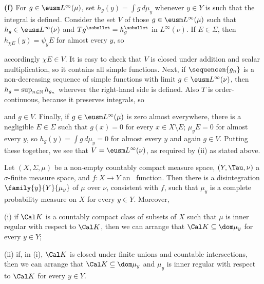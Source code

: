 {\medskip

{\bf (f)} For $g\in\eusm L^{\infty}(\mu)$, set $h_g(y)=\int g\,d\mu_y$
whenever $y\in Y$ is such that the integral is defined.   Consider the
set $V$ of those $g\in\eusm L^{\infty}(\mu)$ such that
$h_g\in\eusm L^{\infty}(\nu)$ and $Tg^{\ssbullet}=h_g^{\ssbullet}$ in
$L^{\infty}(\nu)$.   If $E\in\Sigma$, then $h_{\chi E}(y)=\psi_yE$ for
almost every $y$, so


\noindent accordingly $\chi E\in V$.   It is easy to check that $V$ is
closed under addition and scalar multiplication, so it contains all
simple functions.   Next, if $\sequencen{g_n}$ is a non-decreasing
sequence of simple functions with limit $g\in\eusm L^{\infty}(\nu)$,
then $h_g=\sup_{n\in\Bbb N}h_{g_n}$ wherever the right-hand side is
defined.   Also $T$ is order-continuous, because it preserves integrals,
so


\noindent and $g\in V$.   Finally, if $g\in\eusm L^{\infty}(\mu)$ is
zero almost everywhere, there is a negligible $E\in\Sigma$ such that
$g(x)=0$ for every $x\in X\setminus E$;  $\mu_yE=0$ for almost every
$y$, so $h_g(y)=\int g\,d\mu_y=0$ for almost every $y$ and again
$g\in V$.   Putting these together, we see that
$V=\eusm L^{\infty}(\nu)$, as required by (ii) as stated above.
}%

 Let $(X,\Sigma,\mu)$
be a non-empty countably compact
measure space, $(Y,\Tau,\nu)$ a $\sigma$-finite measure space, and
$f:X\to Y$ an \imp\ function.   Then there is a disintegration
$\family{y}{Y}{\mu_y}$ of $\mu$ over $\nu$, consistent with $f$, such
that $\mu_y$ is a complete probability measure on $X$
for every $y\in Y$.   Moreover,

(i) if $\Cal K$ is a countably compact class of subsets of $X$ such that
$\mu$ is inner regular with respect to $\Cal K$, then we can arrange
that $\Cal K\subseteq\dom\mu_y$ for every $y\in Y$;

(ii) if, in (i), $\Cal K$ is closed under finite unions and countable
intersections, then we can arrange that $\Cal K\subseteq\dom\mu_y$ and
$\mu_y$ is inner regular with respect to $\Cal K$ for every $y\in Y$.

